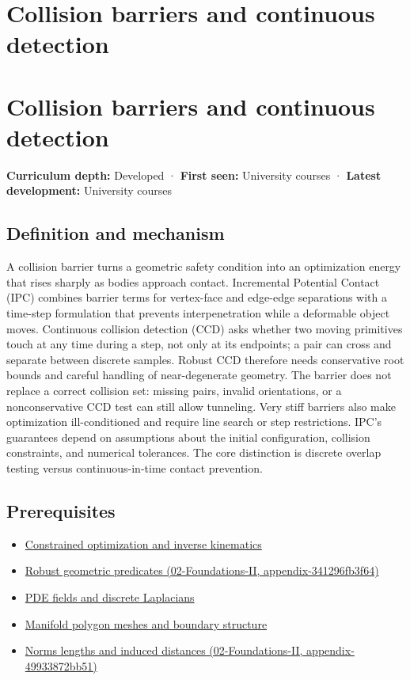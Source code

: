 \hypertarget{appendix-a9ba01fa72a6}{}
\section*{Collision barriers and continuous detection}
\section{Collision barriers and continuous detection}\label{appendix-a9ba01fa72a6-collision-barriers-and-continuous-detection}

\textbf{Curriculum depth:} Developed · \textbf{First seen:} University courses · \textbf{Latest development:} University courses

\subsection{Definition and mechanism}\label{appendix-a9ba01fa72a6-definition-and-mechanism}

A collision barrier turns a geometric safety condition into an optimization energy that rises sharply as bodies approach contact. Incremental Potential Contact (IPC) combines barrier terms for vertex-face and edge-edge separations with a time-step formulation that prevents interpenetration while a deformable object moves. Continuous collision detection (CCD) asks whether two moving primitives touch at any time during a step, not only at its endpoints; a pair can cross and separate between discrete samples. Robust CCD therefore needs conservative root bounds and careful handling of near-degenerate geometry. The barrier does not replace a correct collision set: missing pairs, invalid orientations, or a nonconservative CCD test can still allow tunneling. Very stiff barriers also make optimization ill-conditioned and require line search or step restrictions. IPC's guarantees depend on assumptions about the initial configuration, collision constraints, and numerical tolerances. The core distinction is discrete overlap testing versus continuous-in-time contact prevention.

\subsection{Prerequisites}\label{appendix-a9ba01fa72a6-prerequisites}

\begin{itemize}
\tightlist
\item
  \hyperref[appendix-29f4bea4c2bb]{Constrained optimization and inverse kinematics}
\item
  \href{../02-Foundations-II/main.pdf\#nameddest=appendix-341296fb3f64}{Robust geometric predicates (02-Foundations-II, appendix-341296fb3f64)}
\item
  \hyperref[appendix-1988d465c119]{PDE fields and discrete Laplacians}
\item
  \hyperref[appendix-fab348609369]{Manifold polygon meshes and boundary structure}
\item
  \href{../02-Foundations-II/main.pdf\#nameddest=appendix-49933872bb51}{Norms lengths and induced distances (02-Foundations-II, appendix-49933872bb51)}
\end{itemize}


